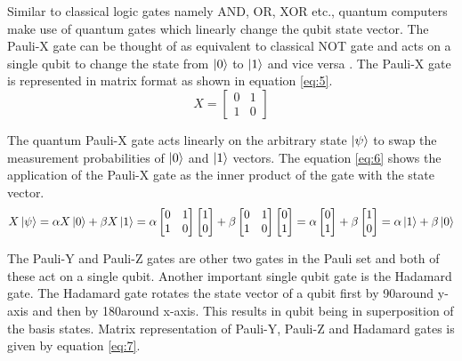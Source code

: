 \documentclass[english,a4paper,11pt,oneside,onecolumn]{book}
\begin{document}
Similar to classical logic gates namely AND, OR, XOR etc., quantum computers make use of quantum gates which linearly change the qubit state vector. The Pauli-X gate can be thought of as equivalent to classical NOT gate and acts on a single qubit to change the state from \(\ket{0}\) to \(\ket{1}\) and vice versa \cite{matuschak_2019_quantum}. The Pauli-X gate is represented in matrix format as shown in equation \ref{eq:5}.
\begin{equation}\label{eq:5}
X = 
\begin{bmatrix}
0 & 1\\
1 & 0
\end{bmatrix}
\end{equation}

The quantum Pauli-X gate acts linearly on the arbitrary state $\ket{\psi}$ to swap the measurement probabilities of \(\ket{0}\) and \(\ket{1}\) vectors. The equation \ref{eq:6} shows the application of the Pauli-X gate as the inner product of the gate with the state vector.
\begin{equation}\label{eq:6}
X\ket{\psi} = \alpha X \ket{0} + \beta X \ket{1} = 
\alpha
\begin{bmatrix}
0 & 1\\
1 & 0
\end{bmatrix}
\begin{bmatrix}
1\\
0
\end{bmatrix} + 
\beta
\begin{bmatrix}
0 & 1\\
1 & 0
\end{bmatrix}
\begin{bmatrix}
0\\
1
\end{bmatrix} = 
\alpha
\begin{bmatrix}
0\\
1
\end{bmatrix} + 
\beta
\begin{bmatrix}
1\\
0
\end{bmatrix} =
\alpha\ket{1} + \beta\ket{0}
\end{equation}

The Pauli-Y and Pauli-Z gates are other two gates in the Pauli set and both of these act on a single qubit. Another important single qubit gate is the Hadamard gate. The Hadamard gate rotates the state vector of a qubit first by 90\degree around y-axis and then by 180\degree around x-axis. This results in qubit being in superposition of the basis states. Matrix representation of Pauli-Y, Pauli-Z and Hadamard gates is given by equation \ref{eq:7}. 
\end{document}
